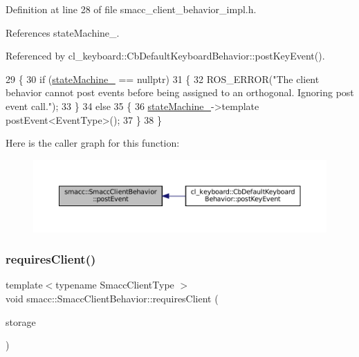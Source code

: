 Definition at line 28 of file smacc\+\_\+client\+\_\+behavior\+\_\+impl.\+h.



References state\+Machine\+\_\+.



Referenced by cl\+\_\+keyboard\+::\+Cb\+Default\+Keyboard\+Behavior\+::post\+Key\+Event().


\begin{DoxyCode}
29 \{
30     \textcolor{keywordflow}{if} (\hyperlink{classsmacc_1_1SmaccClientBehavior_a7950b5684d6de0a8e8959c0936ce9a19}{stateMachine\_} == \textcolor{keyword}{nullptr})
31     \{
32         ROS\_ERROR(\textcolor{stringliteral}{"The client behavior cannot post events before being assigned to an orthogonal. Ignoring
       post event call."});
33     \}
34     \textcolor{keywordflow}{else}
35     \{
36         \hyperlink{classsmacc_1_1SmaccClientBehavior_a7950b5684d6de0a8e8959c0936ce9a19}{stateMachine\_}->template postEvent<EventType>();
37     \}
38 \}
\end{DoxyCode}
Here is the caller graph for this function\+:
\nopagebreak
\begin{figure}[H]
\begin{center}
\leavevmode
\includegraphics[width=350pt]{classsmacc_1_1SmaccClientBehavior_a3152cd2215ebc0e387a8a546de07cded_icgraph}
\end{center}
\end{figure}
\mbox{\label{classsmacc_1_1SmaccClientBehavior_a917f001e763a1059af337bf4e164f542}} 
\subsubsection{\texorpdfstring{requires\+Client()}{requiresClient()}}
{\footnotesize\ttfamily template$<$typename Smacc\+Client\+Type $>$ \\
void smacc\+::\+Smacc\+Client\+Behavior\+::requires\+Client (\begin{DoxyParamCaption}\item[{Smacc\+Client\+Type $\ast$\&}]{storage }\end{DoxyParamCaption})}



